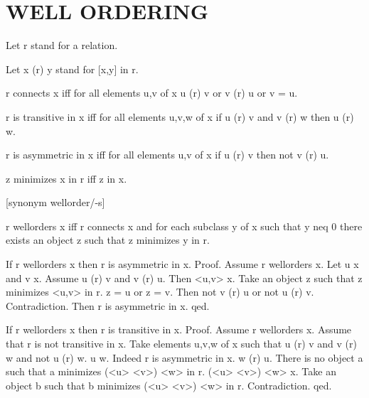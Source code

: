 \documentclass[a4paper,draft]{amsproc}
\begin{document}
\section{WELL ORDERING}
\begin{forthel}

Let r stand for a relation.

Let x (r) y stand for [x,y] in r.

\begin{definition}
r connects x iff for all elements u,v of x u (r) v or v (r) u or v = u.
\end{definition}

\begin{definition}
r is transitive in x iff for all elements u,v,w of x if u (r) v and v (r) w then u (r) w.
\end{definition}

\begin{definition}
r is asymmetric in x iff for all elements u,v of x if u (r) v then not v (r) u.
\end{definition}


\begin{definition}
z minimizes x in r iff z in x. %
\end{definition}

[synonym wellorder/-s]
\begin{definition}
r wellorders x iff r connects x and for each subclass y of x such that y neq 0
there exists an object z such that z minimizes y in r.
\end{definition}

\begin{theorem}
If r wellorders x then r is asymmetric in x.
Proof.
Assume r wellorders x.
Let u \in x and v \in x.
Assume u (r) v and v (r) u.
Then <u,v> \subset x.
Take an object z such that z minimizes <u,v> in r.
z = u or z = v.
Then not v (r) u or not u (r) v.
Contradiction. 
Then r is asymmetric in x.
qed.
\end{theorem}

\begin{theorem}
If r wellorders x then r is transitive in x.
Proof.
Assume r wellorders x.
Assume that r is not transitive in x.
Take elements u,v,w of x such that 
u (r) v and v (r) w and not u (r) w.
u \neq w. Indeed r is asymmetric in x.
w (r) u.
There is no object a such that a minimizes (<u> \cup <v>) \cup <w> in r.
(<u> \cup <v>) \cup <w> \subset x.
Take an object b such that b minimizes (<u> \cup <v>) \cup <w> in r.
Contradiction.
qed.
\end{theorem}


\end{forthel}
\end{document}
